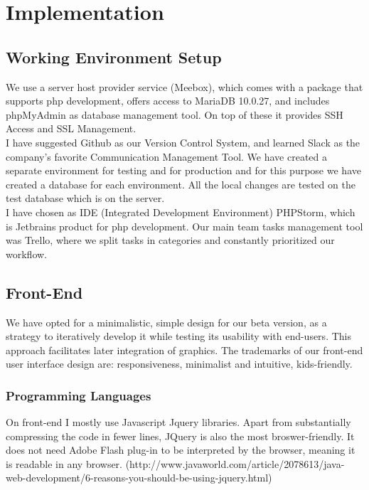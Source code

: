 \chapter{Implementation}

\section{Working Environment Setup} 

We use a server host provider service (Meebox), which comes with a package that supports php development, offers access to MariaDB 10.0.27, and includes phpMyAdmin as database management tool. On top of these it provides SSH Access and SSL Management.\\

I have suggested Github as our Version Control System, and learned Slack as the company's favorite Communication Management Tool. 
We have created a separate environment for testing and for production and for this purpose we have created a database for each environment. All the local changes are tested on the test database which is on the server.\\

I have chosen as IDE (Integrated Development Environment) PHPStorm, which is Jetbrains product for php development. Our main team tasks management tool was Trello, where we split tasks in categories and constantly prioritized our workflow.

\section{Front-End}

We have opted for a minimalistic, simple design for our beta version, as a strategy to iteratively develop it while testing its usability with end-users. This approach facilitates later integration of graphics. The trademarks of our front-end user interface design are: responsiveness, minimalist and intuitive, kids-friendly.\\

\subsection{Programming Languages} 

On front-end I mostly use Javascript Jquery libraries. Apart from substantially compressing the code in fewer lines, JQuery is also the most broswer-friendly. It does not need Adobe Flash plug-in to be interpreted by the browser, meaning it is readable in any browser. (http://www.javaworld.com/article/2078613/java-web-development/6-reasons-you-should-be-using-jquery.html)
\\

